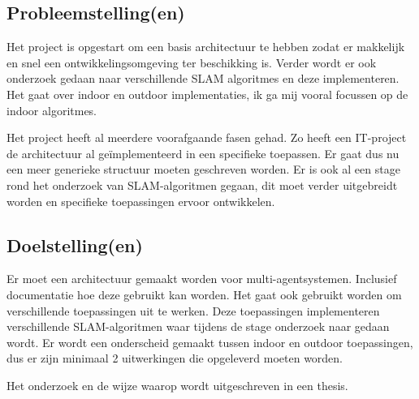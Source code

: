\documentclass[a4paper]{article}
\begin{document}
    \subsection{Probleemstelling(en)}
      Het project is opgestart om een basis architectuur te hebben zodat er makkelijk en
      snel een ontwikkelingsomgeving ter beschikking is. Verder wordt er ook onderzoek gedaan
      naar verschillende SLAM algoritmes en deze implementeren. Het gaat over indoor en outdoor
      implementaties, ik ga mij vooral focussen op de indoor algoritmes.\par
      Het project heeft al meerdere voorafgaande fasen gehad. Zo heeft een IT-project
      de architectuur al geïmplementeerd in een specifieke toepassen. Er gaat dus nu een meer generieke
      structuur moeten geschreven worden. Er is ook al een stage rond het onderzoek van SLAM-algoritmen
      gegaan, dit moet verder uitgebreidt worden en specifieke toepassingen ervoor ontwikkelen.

    \newpage

    \subsection{Doelstelling(en)}
      Er moet een architectuur gemaakt worden voor multi-agentsystemen. Inclusief documentatie
      hoe deze gebruikt kan worden. Het gaat ook gebruikt worden om verschillende toepassingen
      uit te werken. Deze toepassingen implementeren verschillende SLAM-algoritmen waar tijdens
      de stage onderzoek naar gedaan wordt. Er wordt een onderscheid gemaakt tussen indoor en outdoor
      toepassingen, dus er zijn minimaal 2 uitwerkingen die opgeleverd moeten worden.\par
      Het onderzoek en de wijze waarop wordt uitgeschreven in een thesis.

    \newpage
\end{document}
